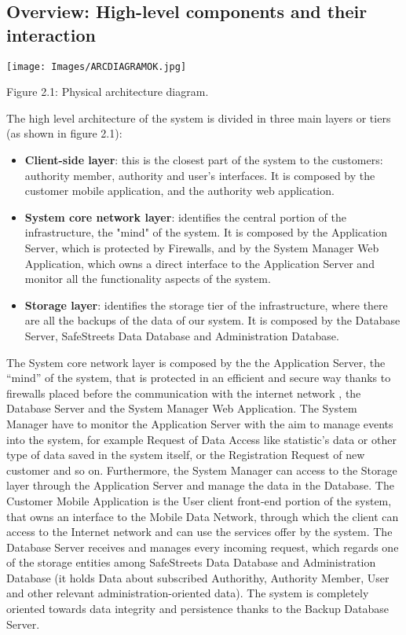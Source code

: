 \documentclass[12pt]{article}
\begin{document}
\subsection{Overview: High-level components and their interaction}
\vspace{5mm}
\begin{center}
\texttt{[image: Images/ARCDIAGRAMOK.jpg]}
\vspace{2mm}

Figure 2.1: Physical architecture diagram.
\end{center}
\vspace{3mm}
The high level architecture of the system is divided in three main layers or tiers (as shown in figure 2.1):
\begin{itemize}
\item \textbf{Client-side layer}: this is the closest part of the system to the customers: authority member, authority and user's interfaces. It is composed by the customer mobile application, and the authority web application.

\item \textbf{System core network layer}: identifies the central portion of the infrastructure, the "mind" of the system. It is composed by the Application Server, which is protected by Firewalls, and by the System Manager Web Application, which owns a direct interface to the Application Server and monitor all the functionality aspects of the system.

\item \textbf{Storage layer}: identifies the storage tier of the infrastructure, where there are all the backups of the data of our system. It is composed by the Database Server, SafeStreets Data Database and Administration Database.
\end{itemize}
The System core network layer is composed by the the Application Server, the “mind” of the system, that is protected in an efficient and secure way thanks to firewalls placed before the communication with the internet network , the Database Server and the System Manager Web Application.
The System Manager have to monitor the Application Server with the aim to manage
events into the system, for example Request of Data Access like statistic's data or other type of data saved in the system itself, or the Registration Request of new customer and so on.
Furthermore, the System Manager can access to the Storage layer through the Application Server and manage the data in the Database.
The Customer Mobile Application is the User client front-end portion of the system, that owns
an interface to the Mobile Data Network, through which the client can access to the Internet
network and can use the services offer by the system.
The Database Server receives and manages every incoming request, which regards one of the storage entities among SafeStreets Data Database and Administration Database (it holds
Data about subscribed Authorithy, Authority Member, User  and other relevant administration-oriented data). The system is completely oriented towards data integrity and persistence thanks to the Backup Database Server.
\end{document}
